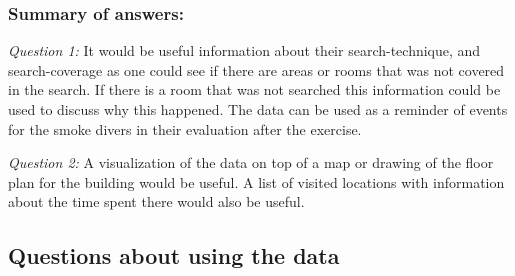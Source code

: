\documentclass[../Main/thesis.tex]{subfiles}
\begin{document}
\subsubsection*{Summary of answers:}
\textit{Question 1:}
It would be useful information about their search-technique, and search-coverage as one could see if there are areas or rooms that was not covered in the search.
If there is a room that was not searched this information could be used to discuss why this happened.
The data can be used as a reminder of events for the smoke divers in their evaluation after the exercise.

\textit{Question 2:}
A visualization of the data on top of a map or drawing of the floor plan for the building would be useful.
A list of visited locations with information about the time spent there would also be useful.

\subsection{Questions about using the data}
\end{document}
